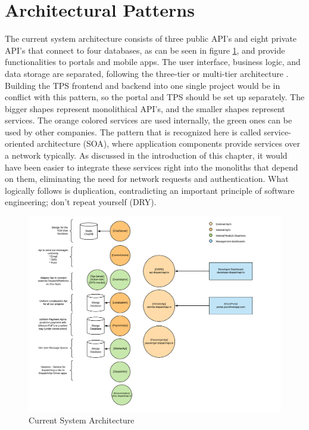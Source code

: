 \section{Architectural Patterns}
The current system architecture consists of three public API's and eight private API's that connect to four databases, as can be seen in figure \ref{fig:Architecture}, and provide functionalities to portals and mobile apps.
The user interface, business logic, and data storage are separated, following the three-tier or multi-tier architecture \cite{IBM-3-tier}. Building the TPS frontend and backend into one single project would be in conflict with this pattern, so the portal and TPS should be set up separately.
The bigger shapes represent monolithical API's, and the smaller shapes represent services. The orange colored services are used internally, the green ones can be used by other companies. The pattern that is recognized here is called service-oriented architecture (SOA), where application components provide services over a network typically. As discussed in the introduction of this chapter, it would have been easier to integrate these services right into the monoliths that depend on them, eliminating the need for network requests and authentication. What logically follows is duplication, contradicting an important principle of software engineering; don't repeat yourself (DRY).

\begin{figure}[htbp!]
	\centering
	\includegraphics[width=1\textwidth]{Architecture}
	\caption[Architecture]{Current System Architecture}
	\label{fig:Architecture}
\end{figure}

